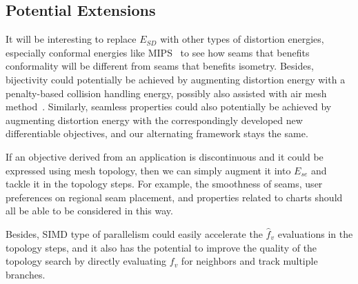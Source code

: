 
\subsection{Potential Extensions}
It will be interesting to replace $E_{SD}$ with other types of distortion energies, especially conformal energies like MIPS~\cite{Hormann2000MIPS} to see how seams that benefits conformality will be different from seams that benefits isometry.
Besides, bijectivity could potentially be achieved by augmenting distortion energy with a penalty-based collision handling energy, possibly also assisted with air mesh method~\cite{?}.
Similarly, seamless properties could also potentially be achieved by augmenting distortion energy with the correspondingly developed new differentiable objectives, and our alternating framework stays the same.

If an objective derived from an application is discontinuous and it could be expressed using mesh topology, then we can simply augment it into $E_{se}$ and tackle it in the topology steps. For example, the smoothness of seams, user preferences on regional seam placement, and properties related to charts should all be able to be considered in this way.

Besides, SIMD type of parallelism could easily accelerate the $\hat{f}_v$ evaluations in the topology steps, and it also has the potential to improve the quality of the topology search by directly evaluating $f_v$ for neighbors and track multiple branches.